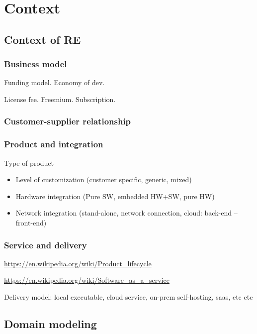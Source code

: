 
\chapter{Context}%

\section{Context of RE}

\subsection{Business model}
Funding model. Economy of dev.

License fee. Freemium. Subscription.

\subsection{Customer-supplier relationship}

\subsection{Product and integration}

Type of product

\begin{itemize}
  \item Level of customization (customer specific, generic, mixed)
  \item Hardware integration (Pure SW, embedded HW+SW, pure HW)
  \item Network integration (stand-alone, network connection, cloud: back-end -- front-end)
\end{itemize}

\subsection{Service and delivery}

\url{https://en.wikipedia.org/wiki/Product_lifecycle}

\url{https://en.wikipedia.org/wiki/Software_as_a_service}

Delivery model: local executable, cloud service, on-prem self-hosting, saas, etc etc


\section{Domain modeling}

